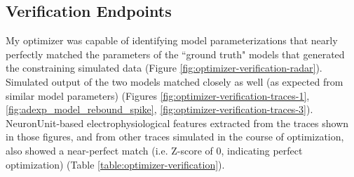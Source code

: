 \subsection{Verification Endpoints}
My optimizer was capable of identifying model parameterizations that nearly perfectly matched the parameters of the ``ground truth" models that generated the constraining simulated data (Figure \ref{fig:optimizer-verification-radar}).
Simulated output of the two models matched closely as well (as expected from similar model parameters) (Figures \ref{fig:optimizer-verification-traces-1}, \ref{fig:adexp_model_rebound_spike}, \ref{fig:optimizer-verification-traces-3}).
NeuronUnit-based electrophysiological features extracted from the traces shown in those figures, and from other traces simulated in the course of optimization, also showed a near-perfect match (i.e. Z-score of 0, indicating perfect optimization) (Table \ref{table:optimizer-verification}).

\begin{table}[ht]
\centering
{}
\caption[Optimizer verification table]{``Observed" and ``Predicted" electrophysiological features match nearly perfectly.
Generally, ``observed" would refer to observations taken from biological data, but here it refers to observations from simulations of the ground truth model using various stimuli.
Each test extracts an electrophysiological features from some stimulus.
``Predicted refers to the predicted values of these features from the optimized model.
Z-Scores of 0, self-evident from the equality of the first two columns, indicate perfect optimization for this set of features.}
\label{table:optimizer-verification}
\end{table}

